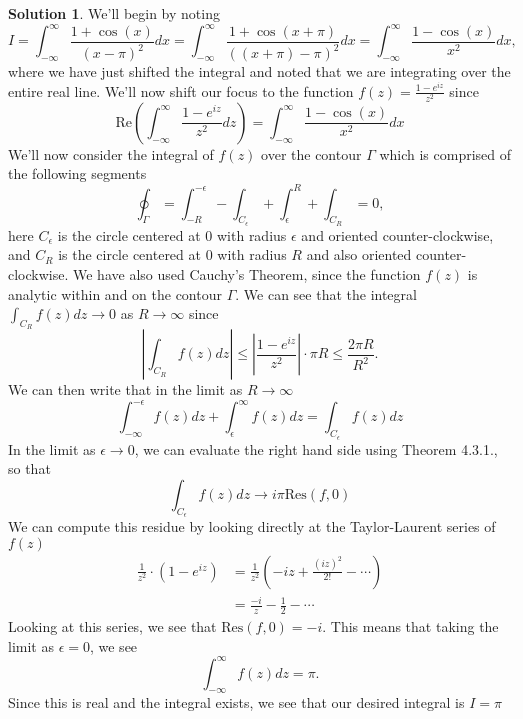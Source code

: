 \documentclass[12pt]{article}
\newcommand{\abs}[1]{ \left| #1 \right| }
\newcommand{\Res}{\text{Res}}
\renewcommand{\Re}{\text{Re}}
\theoremstyle{definition}
\newtheorem{sol}{Solution}
\theoremstyle{remark}
\begin{document}
\begin{sol}
    We'll begin by noting 
   \begin{equation}
       I = \int_{-\infty}^{\infty} \frac{1+\cos(x)}{(x-\pi)^2} dx =  \int_{-\infty}^{\infty} \frac{1+\cos(x+\pi)}{( (x+\pi)-\pi)^2} dx =  \int_{-\infty}^{\infty} \frac{1-\cos(x)}{x^2} dx, 
   \end{equation} 
   where we have just shifted the integral and noted that we are integrating over the entire real line. We'll now shift our focus to the function $f(z) = \frac{1 - e^{iz}}{z^2}$ since 
   \begin{equation}
       \Re \left(  \int_{-\infty}^{\infty} \frac{1-e^{iz}}{z^2} dz
\right) = \int_{-\infty}^{\infty} \frac{1-\cos(x)}{x^2} dx
   \end{equation}
   We'll now consider the integral of $f(z)$ over the contour $\Gamma$ which is comprised of the following segments
   \begin{equation}
       \oint_\Gamma = \int_{-R}^{-\epsilon} - \int_{C_{\epsilon}} + \int_{\epsilon}^{R} + \int_{C_{R}}= 0,
   \end{equation}
   here $C_\epsilon$ is the circle centered at 0 with radius $\epsilon$ and oriented counter-clockwise, and $C_R$ is the circle centered at 0 with radius $R$ and also oriented counter-clockwise. We have also used Cauchy's Theorem, since the function $f(z)$ is analytic within and on the contour $\Gamma$. We can see that the integral $\int_{C_{R}} f(z)dz \to 0$ as $R\to\infty$ since
   \begin{equation}  
       \abs{ \int_{C_{R}} f(z)dz } \leq \abs{ \frac{1-e^{iz}}{z^2}  } \cdot \pi R \leq \frac{2\pi R}{R^2}.
   \end{equation}
We can then write that in the limit as $R\to\infty$
\begin{equation}
 \int_{-\infty}^{-\epsilon} f(z)dz + \int_{\epsilon}^{\infty} f(z)dz = \int_{C_{\epsilon}} f(z)dz
\end{equation}
In the limit as $\epsilon\to0$, we can evaluate the right hand side using Theorem 4.3.1., so that
\begin{equation}
    \int_{C_{\epsilon}} f(z)dz \to i \pi \Res(f, 0)
\end{equation}
We can compute this residue by looking directly at the Taylor-Laurent series of $f(z)$
\begin{align}
    \frac{1}{z^2} \cdot \left( 1-e^{iz}\right) &= \frac{1}{z^2} \left( -iz + \frac{(iz)^2}{2!} - \cdots  \right)\\
                                               &= \frac{-i}{z} - \frac{1}{2} - \cdots  
\end{align}
Looking at this series, we see that $\Res(f, 0) = -i$. This means that taking the limit as $\epsilon = 0$, we see
\begin{equation}
    \int_{-\infty}^{\infty} f(z)dz = \pi.
\end{equation}
Since this is real and the integral exists, we see that our desired integral is $I = \pi$
\end{sol}
\end{document}
